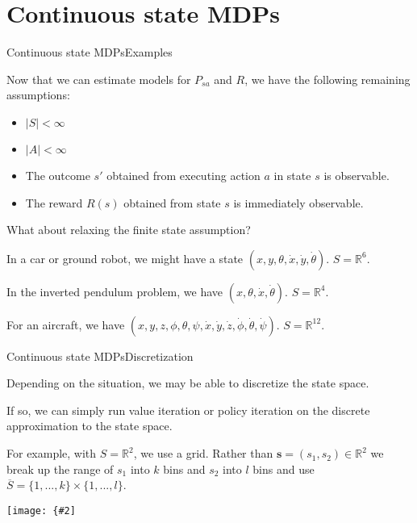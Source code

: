 \documentclass{beamer}
\renewcommand{\vec}[1]{\boldsymbol{#1}}
\def\Rset{\mathbb{R}}
\newcommand{\myfig}[3]{\centerline{\texttt{[image: \{\#2]}}}
    \centerline{\scriptsize #3}}
\begin{document}
\section{Continuous state MDPs}

\begin{frame}{Continuous state MDPs}{Examples}

  Now that we can estimate models for $P_{sa}$ and $R$, we have
  the following remaining assumptions:
  \begin{itemize}
  \item $|S| < \infty$
  \item $|A| < \infty$
  \item The outcome $s'$ obtained from executing action $a$ in state
    $s$ is observable.
  \item The reward $R(s)$ obtained from state $s$ is immediately
    observable.
  \end{itemize}

  \medskip

  What about \alert{relaxing the finite state assumption}?

  \medskip

  In a car or ground robot, we might have a state
  $(x,y,\theta,\dot{x},\dot{y},\dot{\theta})$. $S = \Rset^6$.

  \medskip

  In the inverted pendulum problem, we have
  $(x,\theta,\dot{x},\dot{\theta})$. $S=\Rset^4$.

  \medskip

  For an aircraft, we have $(x,y,z,\phi,\theta,\psi,\dot{x},\dot{y},\dot{z},\dot{\phi},\dot{\theta},\dot{\psi})$. $S = \Rset^{12}$.

\end{frame}


\begin{frame}{Continuous state MDPs}{Discretization}

  Depending on the situation, we may be able to \alert{discretize} the state space.

  \medskip

  If so, we can simply run value iteration or policy iteration on the
  discrete approximation to the state space.

  \medskip

  For example, with $S=\Rset^2$, we use a \alert{grid}. Rather than $\vec{s} = (s_1,s_2) \in \Rset^2$ we break up the range of $s_1$ into $k$ bins and $s_2$ into $l$ bins and use $\overline{S} = \{1,...,k\}\times \{1,...,l\}$.

  \medskip

  \myfig{1.5in}{ng-discrete}{Ng (2017), CS 229 lecture notes, set 12}
  
\end{frame}
\end{document}

